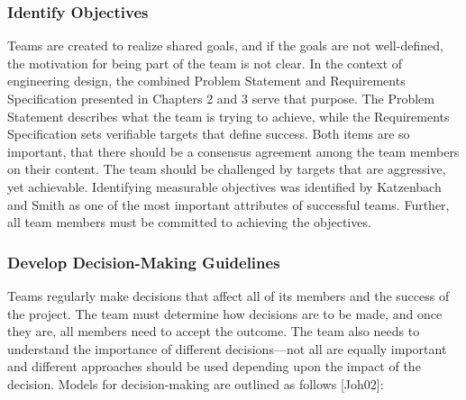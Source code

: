 \subsubsection{Identify Objectives}\label{identify-objectives}

Teams are created to realize shared goals, and if the goals are not
well-defined, the motivation for being part of the team is not clear. In
the context of engineering design, the combined Problem Statement and
Requirements Specification presented in Chapters 2 and 3 serve that
purpose. The Problem Statement describes what the team is trying to
achieve, while the Requirements Specification sets verifiable targets
that define success. Both items are so important, that there should be a
consensus agreement among the team members on their content. The team
should be challenged by targets that are aggressive, yet achievable.
Identifying measurable objectives was identified by Katzenbach and Smith
as one of the most important attributes of successful teams. Further,
all team members must be committed to achieving the objectives.

\subsubsection{Develop Decision-Making
Guidelines}\label{develop-decision-making-guidelines}

Teams regularly make decisions that affect all of its members and the
success of the project. The team must determine how decisions are to be
made, and once they are, all members need to accept the outcome. The
team also needs to understand the importance of different
decisions---not all are equally important and different approaches
should be used depending upon the impact of the decision. Models for
decision-making are outlined as follows {[}Joh02{]}:

